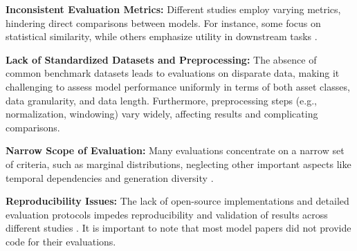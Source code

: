 \documentclass[sigconf]{acmart}
\begin{document}
      \begin{enumerate}[label=\textbf{[L\arabic*]}]
        \item \label{limitation:metrics}
        \textbf{Inconsistent Evaluation Metrics:} Different 
        studies employ varying metrics, hindering direct comparisons 
        between models. For instance, some focus on statistical 
        similarity, while others emphasize utility in downstream tasks 
        \cite{Stenger24}.
        
        \item \textbf{Lack of Standardized Datasets and 
        Preprocessing:} The absence of common benchmark datasets leads 
        to evaluations on disparate data, making it challenging to 
        assess model performance uniformly \cite{Stenger24} in terms 
        of both asset classes, data granularity, and data length. 
        Furthermore, preprocessing steps (e.g., normalization, 
        windowing) vary widely, affecting results and complicating 
        comparisons.
        
        \item \textbf{Narrow Scope of Evaluation:} Many evaluations 
        concentrate on a narrow set of criteria, such as marginal 
        distributions, neglecting other important aspects like 
        temporal dependencies and generation diversity
        \cite{Stenger24}.
        
        \item \textbf{Reproducibility Issues:} The lack of 
        open-source implementations and detailed evaluation protocols 
        impedes reproducibility and validation of results across 
        different studies \cite{Stenger24,Potluru24}. It is important
        to note that most model papers did not provide code for their 
        evaluations.
      \end{enumerate}
\end{document}
